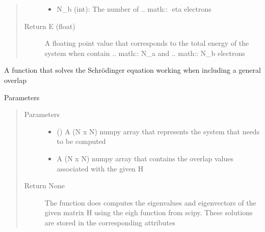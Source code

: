 \documentclass[letterpaper,10pt,english]{sphinxmanual}
\begin{document}
\begin{fulllineitems}
\begin{fulllineitems}
\begin{quote}
\begin{description}
\begin{itemize}
\item {} 
 \textendash{} N\_b (int): The number of .. math:: eta electrons

\end{itemize}

\item[{Return E (float)}] \leavevmode
A floating point value that corresponds to the total energy of the system
when contain .. math:: N\_a and .. math:: N\_b electrons

\end{description}\end{quote}

\end{fulllineitems}


\begin{fulllineitems}
\label{\detokenize{modules/gqcml.data_generators:gqcml.data_generators.Huckel.HuckelSolver.solve_general}}
A function that solves the Schrödinger equation working when including a general overlap

Parameters
\begin{quote}\begin{description}
\item[{Parameters}] \leavevmode\begin{itemize}
\item {} 
\sphinxstyleliteralstrong{\sphinxupquote{(}}\sphinxstyleliteralstrong{\sphinxupquote{)}} () \textendash{} A (N x N) numpy array that represents the system that needs to be computed

\item {} 
\sphinxstyleliteralstrong{\sphinxupquote{(}}\sphinxstyleliteralstrong{\sphinxupquote{)}} \textendash{} A (N x N) numpy array that contains the overlap values associated with the
given H

\end{itemize}

\item[{Return None}] \leavevmode
The function does computes the eigenvalues and eigenvectors of the given matrix H
using the eigh function from scipy. These solutions are stored in the corresponding attributes


\end{description}
\end{quote}
\end{fulllineitems}
\end{fulllineitems}
\end{document}
